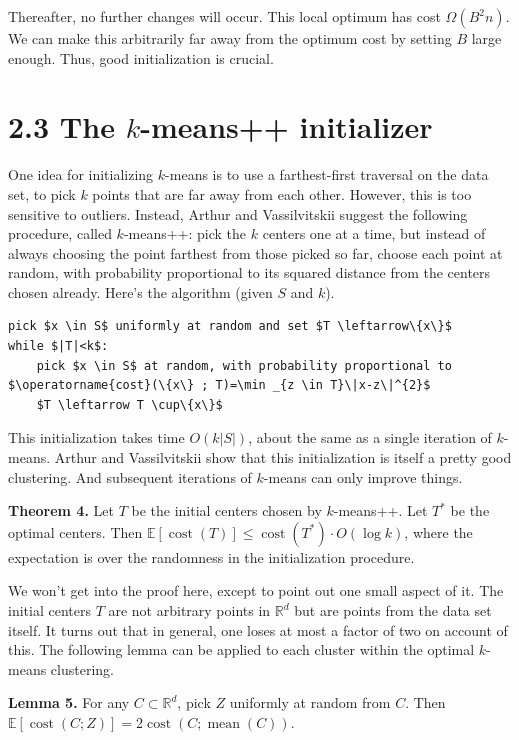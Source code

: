 \documentclass{article}
\begin{document}
Thereafter, no further changes will occur. This local optimum has cost $\Omega\left(B^{2} n\right)$. We can make this arbitrarily far away from the optimum cost by setting $B$ large enough. Thus, good initialization is crucial.

\section*{2.3 The $k$-means++ initializer}

One idea for initializing $k$-means is to use a farthest-first traversal on the data set, to pick $k$ points that are far away from each other. However, this is too sensitive to outliers. Instead, Arthur and Vassilvitskii suggest the following procedure, called $k$-means++: pick the $k$ centers one at a time, but instead of always choosing the point farthest from those picked so far, choose each point at random, with probability proportional to its squared distance from the centers chosen already. Here's the algorithm (given $S$ and $k$).

\begin{verbatim}
pick $x \in S$ uniformly at random and set $T \leftarrow\{x\}$
while $|T|<k$:
    pick $x \in S$ at random, with probability proportional to $\operatorname{cost}(\{x\} ; T)=\min _{z \in T}\|x-z\|^{2}$
    $T \leftarrow T \cup\{x\}$
\end{verbatim}

This initialization takes time $O(k|S|)$, about the same as a single iteration of $k$-means. Arthur and Vassilvitskii show that this initialization is itself a pretty good clustering. And subsequent iterations of $k$-means can only improve things.

\textbf{Theorem 4.} Let $T$ be the initial centers chosen by $k$-means++. Let $T^{*}$ be the optimal centers. Then $\mathbb{E}[\operatorname{cost}(T)] \leq \operatorname{cost}\left(T^{*}\right) \cdot O(\log k)$, where the expectation is over the randomness in the initialization procedure.

We won't get into the proof here, except to point out one small aspect of it. The initial centers $T$ are not arbitrary points in $\mathbb{R}^{d}$ but are points from the data set itself. It turns out that in general, one loses at most a factor of two on account of this. The following lemma can be applied to each cluster within the optimal $k$-means clustering.

\textbf{Lemma 5.} For any $C \subset \mathbb{R}^{d}$, pick $Z$ uniformly at random from $C$. Then $\mathbb{E}[\operatorname{cost}(C ; Z)]=2 \operatorname{cost}(C ; \operatorname{mean}(C))$.
\end{document}
